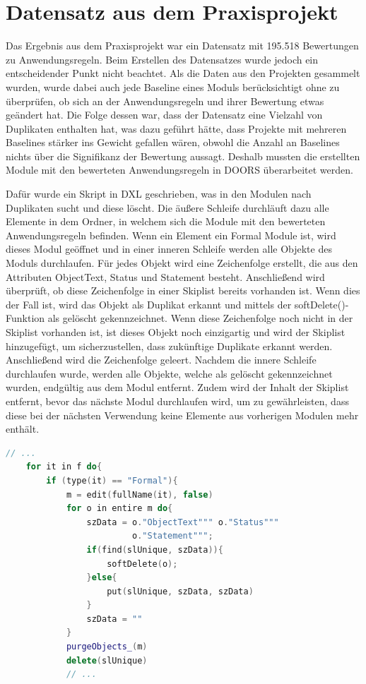 \section{Datensatz aus dem Praxisprojekt}
\label{chap:DataPraxisprojekt}
Das Ergebnis aus dem Praxisprojekt war ein Datensatz mit 195.518 Bewertungen zu Anwendungsregeln. Beim Erstellen des Datensatzes wurde jedoch ein entscheidender Punkt nicht beachtet.
Als die Daten aus den Projekten gesammelt wurden, wurde dabei auch jede Baseline eines Moduls berücksichtigt ohne zu überprüfen, ob sich an der Anwendungsregeln und ihrer Bewertung
etwas geändert hat. Die Folge dessen war, dass der Datensatz eine Vielzahl von Duplikaten enthalten hat, was dazu geführt hätte, dass Projekte mit mehreren Baselines 
stärker ins Gewicht gefallen wären, obwohl die Anzahl an Baselines nichts über die Signifikanz der Bewertung aussagt. Deshalb mussten die erstellten Module mit den bewerteten Anwendungsregeln
in \ac{DOORS} überarbeitet werden. 

Dafür wurde ein Skript in \ac{DXL} geschrieben, was in den Modulen nach Duplikaten sucht und diese löscht. Die äußere Schleife durchläuft dazu alle 
Elemente in dem Ordner, in welchem sich die Module mit den bewerteten Anwendungsregeln befinden. Wenn ein Element ein Formal Module ist, 
wird dieses Modul geöffnet und in einer inneren Schleife werden alle Objekte des Moduls durchlaufen. Für jedes Objekt wird eine 
Zeichenfolge erstellt, die aus den Attributen ObjectText, Status und Statement besteht. Anschließend wird überprüft, ob diese Zeichenfolge
in einer Skiplist bereits vorhanden ist. Wenn dies der Fall ist, wird das Objekt als Duplikat erkannt und mittels der softDelete()-Funktion
als gelöscht gekennzeichnet. Wenn diese Zeichenfolge noch nicht in der Skiplist vorhanden ist, ist dieses Objekt noch einzigartig und wird der Skiplist
hinzugefügt, um sicherzustellen, dass zukünftige Duplikate erkannt werden. Anschließend wird die Zeichenfolge geleert. Nachdem die innere Schleife durchlaufen wurde,
werden alle Objekte, welche als gelöscht gekennzeichnet wurden, endgültig aus dem Modul entfernt. Zudem wird der Inhalt der Skiplist entfernt, bevor das nächste Modul durchlaufen wird, um 
zu gewährleisten, dass diese bei der nächsten Verwendung keine Elemente aus vorherigen Modulen mehr enthält.

\begin{lstlisting}[language = C++, caption={Duplikate in Modulen löschen},captionpos=b, label = lst:deleteDuplicates, float, floatplacement=H]
    // ...
    for it in f do{
        if (type(it) == "Formal"){
            m = edit(fullName(it), false)
            for o in entire m do{
                szData = o."ObjectText""" o."Status""" 
                         o."Statement""";
                if(find(slUnique, szData)){
                    softDelete(o);
                }else{
                    put(slUnique, szData, szData)
                }
                szData = "" 
            }
            purgeObjects_(m)
            delete(slUnique)
            // ...
\end{lstlisting}

